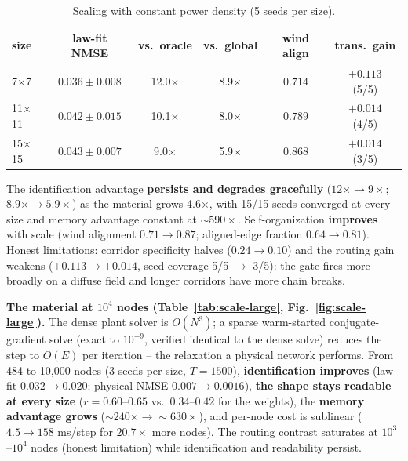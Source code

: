 \documentclass[conference]{IEEEtran}
\begin{document}
\begin{table}[t]
\centering\scriptsize
\caption{Scaling with constant power density (5 seeds per size).}
\label{tab:scale}
\begin{tabular}{lccccc}
\toprule
size & law-fit NMSE & vs.\ oracle & vs.\ global & wind align & trans.\ gain \\
\midrule
7$\times$7 & $0.036 \pm 0.008$ & 12.0$\times$ & 8.9$\times$ & $0.714$ & $+0.113$ (5/5) \\
11$\times$11 & $0.042 \pm 0.015$ & 10.1$\times$ & 8.0$\times$ & $0.789$ & $+0.014$ (4/5) \\
15$\times$15 & $0.043 \pm 0.007$ & 9.0$\times$ & 5.9$\times$ & $0.868$ & $+0.014$ (3/5) \\
\bottomrule
\end{tabular}
\end{table}

The identification advantage \textbf{persists and degrades gracefully}
($12\times \to 9\times$; $8.9\times \to 5.9\times$) as the material grows 4.6$\times$,
with 15/15 seeds converged at every size and memory advantage constant at
${\sim}590\times$. Self-organization \textbf{improves} with scale (wind alignment
$0.71 \to 0.87$; aligned-edge fraction $0.64 \to 0.81$). Honest limitations: corridor
specificity halves ($0.24 \to 0.10$) and the routing gain weakens
($+0.113 \to +0.014$, seed coverage 5/5 $\to$ 3/5): the gate fires more broadly on a
diffuse field and longer corridors have more chain breaks.

\textbf{The material at $10^4$ nodes (Table~\ref{tab:scale-large}, Fig.~\ref{fig:scale-large}).}
The dense plant solver is $O(N^3)$; a sparse warm-started conjugate-gradient solve
(exact to $10^{-9}$, verified identical to the dense solve) reduces the step to $O(E)$
per iteration -- the relaxation a physical network performs. From 484 to 10,000
nodes (3 seeds per size, $T{=}1500$), \textbf{identification improves} (law-fit
$0.032 \to 0.020$; physical NMSE $0.007 \to 0.0016$), \textbf{the shape stays
readable at every size} ($r = 0.60$--$0.65$ vs.\ $0.34$--$0.42$ for the weights),
the \textbf{memory advantage grows} (${\sim}240\times \to {\sim}630\times$), and
per-node cost is sublinear ($4.5 \to 158$ ms/step for $20.7\times$ more nodes). The
routing contrast saturates at $10^3$--$10^4$ nodes (honest limitation) while
identification and readability persist.
\end{document}
